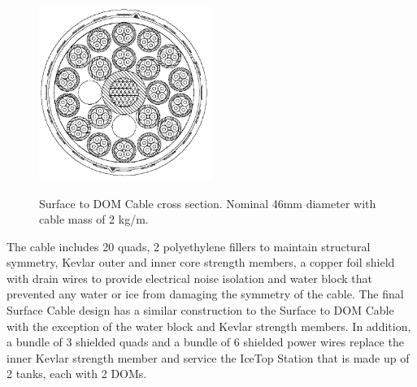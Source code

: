 \begin{figure}
  \centering
  \includegraphics[width=0.5\textwidth]{graphics/cables/cable_xsection.png}
  \label{fig:cable_xsection}
  \caption{Surface to DOM Cable cross section. Nominal 46mm diameter with
    cable mass of 2 kg/m.} 
\end{figure}

The cable includes 20 quads, 2 polyethylene fillers to maintain structural
symmetry, Kevlar outer and inner core strength members, a copper foil
shield with drain wires to provide electrical noise isolation and water
block that prevented any water or ice from damaging the symmetry of the
cable. The final Surface Cable design has a similar construction to the
Surface to DOM Cable with the exception of the water block and Kevlar
strength members. In addition, a bundle of 3 shielded quads and a bundle of
6 shielded power wires replace the inner Kevlar strength member and service
the IceTop Station that is made up of 2 tanks, each with 2 DOMs.

